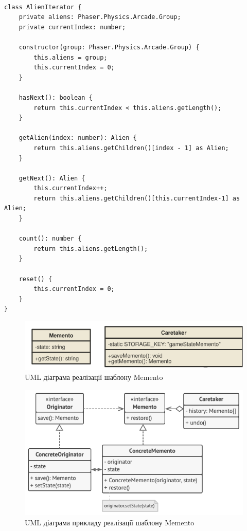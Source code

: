 \documentclass[oneside,14pt]{extarticle}
\begin{document}
\begin{normalsize}
	\begin{small}
		\begin{lstlisting}

class AlienIterator {
	private aliens: Phaser.Physics.Arcade.Group;
	private currentIndex: number;
	
	constructor(group: Phaser.Physics.Arcade.Group) {
		this.aliens = group;
		this.currentIndex = 0;
	}
	
	hasNext(): boolean {
		return this.currentIndex < this.aliens.getLength();
	}
	
	getAlien(index: number): Alien {
		return this.aliens.getChildren()[index - 1] as Alien;
	}
	
	getNext(): Alien {
		this.currentIndex++;
		return this.aliens.getChildren()[this.currentIndex-1] as Alien;
	}
	
	count(): number {
		return this.aliens.getLength();
	}
	
	reset() {
		this.currentIndex = 0;
	}
}
		\end{lstlisting}
	\end{small}
	
	\begin{figure}[H]
		\centering
		\includegraphics[width=\textwidth]{memento}
		\caption{UML діаграма реалізації шаблону Memento}
	\end{figure}
	
		\begin{figure}[H]
		\centering
		\includegraphics[width=\textwidth]{memento-ex}
		\caption{UML діаграма прикладу реалізації шаблону Memento}
	\end{figure}
	

\end{normalsize}
\end{document}
